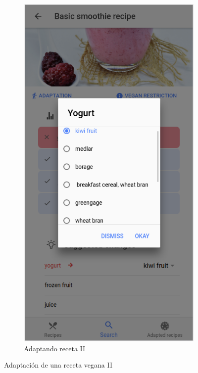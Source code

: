\begin{figure}[H]
\begin{subfigure}[b]{0.301\linewidth}
    \end{subfigure}
    \begin{subfigure}[b]{0.299\linewidth}
        \includegraphics[width=\linewidth]{imagenes/app/pantallas/ejemplo12.png}
        \caption{Adaptando receta II}
        \label{fig:ejemplo12}
    \end{subfigure}
    \caption{Adaptación de una receta vegana II}
    \label{fig:seleccion3}
\end{figure}


